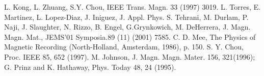\documentclass[12pt,a4]{report}
\begin{document}

\newpage
{}




\newpage
{}
\appendix



\newpage
%

%

\begin{thebibliography}{99}
 L. Kong, L. Zhuang, S.Y. Chou, IEEE Trans. Magn. 33
(1997) 3019.
 L. Torres, E. Martinez, L. Lopez-Diaz, J. Iniguez,
J. Appl. Phys.
 S. Tehrani, M. Durlam, P. Naji, J. Slaughter, N.
Rizzo, B. Engel, G.Grynkowich, M. DeHerrera, J. Magn. Magn. Mat.,
JEMS'01 Symposia.89 (11) (2001) 7585.
 C. D. Mee, The Physics of Magnetic Recording
(North-Holland, Amsterdam, 1986), p. 150.
 S. Y. Chou, Proc. IEEE 85, 652 (1997).
 M. Johnson, J. Magn. Magn. Mater. 156, 321(1996); G. Prinz and K.
Hathaway, Phys. Today 48, 24 (1995).
\end{thebibliography}
\end{document}
